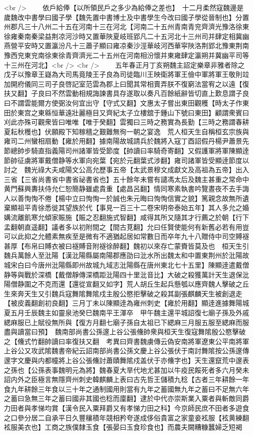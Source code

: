 <br />
　　依戶給俸【以所領民戶之多少為給俸之差也】　十二月柔然寇魏邊是歲魏改中書學曰國子學【魏先置中書博士及中書學生今改曰國子學從晉制也】分置州郡凡三十八州二十五在河南十三在河北【河南二十五州青南青兖齊濟光豫洛徐東徐雍秦南秦梁益荆凉河沙時又置華陜夏岐班郢凡二十五河北十三州司并肆定相冀幽燕營平安時又置瀛汾凡十三蕭子顯曰雍凉秦沙涇華岐河西華寜陜洛荆郢北豫東荆南豫西兖東兖南徐東徐青齊濟光二十五州在河南相汾懷并東雍肆定瀛朔并冀幽平司等十三州在河北】<br />
<br />
　　五年春正月丁亥朔魏主詔定樂章非雅者除之　戊子以豫章王嶷為大司馬竟陵王子良為司徒臨川王映衛將軍王儉中軍將軍王敬則竝加開府儀同三司子良啓記室范雲為郡上曰聞其常相賣弄朕不復窮法當宥之以遠【復扶又翻】子良曰不然雲動相規誨諫書具存遂取以奏凡百餘紙辭皆切直上歎息謂子良曰不謂雲能爾方使弼汝何宜出守【守式又翻】文惠太子嘗出東田觀穫【時太子作東田於東宫之東緜恒華遠壯麗極目又齊紀太子立樓舘于鍾山下號曰東田】顧謂衆賓曰刈此亦殊可觀衆皆曰唯唯【唯于癸翻】雲獨曰三時之務實為長勤【三時之務謂春耕夏耘秋穫也】伏願殿下知稼穡之艱難無徇一朝之宴逸　荒人桓天生自稱桓玄宗族與雍司二州蠻相扇動【雍於用翻】據南陽故城請兵於魏將入寇丁酉詔假丹楊尹蕭景先節總帥步騎直指義陽司州諸軍皆受節度【帥讀曰率騎奇寄翻】又假護軍將軍陳顯逹節帥征虜將軍戴僧静等水軍向宛葉【宛於元翻葉式涉翻】雍司諸軍皆受顯逹節度以討之　魏光祿大夫咸陽文公高允歷事五帝【太武景穆文成獻文及高祖為五帝】出入三省【三省尚書省中書省祕書省也】五十餘年未嘗有譴馮太后及魏主甚重之常命中黄門蘇興夀扶侍允仁恕簡静雖處貴重【處昌呂翻】情同寒素執書吟覽晝夜不去手誨人以善恂恂不倦【楊中立曰恂恂一於誠也朱元晦曰恂恂信實之貌】篤親念故無所遺棄顯祖平青徐悉徙其望族於代【事見一百三十二卷宋明帝泰始五年】其人多允之婚媾流離飢寒允傾家賑施【賑之忍翻施式智翻】咸得其所又隨其才行薦之於朝【行下孟翻朝直遥翻】議者多以初附間之【間古莧翻】允曰任賢使能何有新舊必若有用豈可以此抑之允體素無疾至是微有不適猶起居如常數日而卒年九十八贈侍中司空賻襚甚厚【布帛曰賻衣被曰襚賻音附襚徐醉翻】魏初以來存亡蒙賚皆莫及也　桓天生引魏兵萬餘人至沘陽【漢沘陽縣屬南陽郡應劭曰沘水所出魏太和中置東荆州於沘陽故城宋白曰今唐州沘陽縣即州故城九域志沘陽縣在唐州東北七十五里】陳顯逹遣戴僧静等與戰於深橋【戴僧靜傳深橋距沘陽四十里沘音比】大破之殺獲萬計天生退保沘陽僧静圍之不克而還【還從宣翻又如字】荒人胡丘生起兵懸瓠以應齊魏人擊破之丘生來奔天生又引魏兵寇舞隂舞隂戍主殷公愍拒擊破之殺其副張麒麟天生被創退走【被皮義翻創初良翻】三月丁未以陳顯逹為雍州刺史【雍於用翻】顯逹進據舞陽城　夏五月壬辰魏主如靈泉池癸巳魏南平王渾卒　甲午魏主還平城詔復七廟子孫及外戚緦麻服已上賦役無所與【復方月翻七廟子孫自太祖已下緦麻三月服五服至緦麻而服盡與讀當曰預】　魏南部尚書公孫邃上谷公張儵帥衆與桓天生復寇舞隂殷公愍擊破之【儵式竹翻帥讀曰率復扶又翻　考異曰齊書魏虜傳云偽安南將軍遼東公平南將軍上谷公又攻武隂魏書帝紀云詔南部尚書公孫文慶上谷公張伏于南討舞隂按公孫邃傳邃字文慶與内都幢將上谷公張儵討蕭賾舞隂戍盖伏于亦儵字也】天生還竄荒中邃表之孫也【公孫表事魏明元為將】魏春夏大旱代地尤甚加以牛疫民餒死者多六月癸未詔内外之臣極言無隱齊州刺史韓麒麟上表曰古先哲王儲積九稔【古者三年耕餘一年食九年耕餘三年食以三十年之通制國用則當有九年之蓄國無九年之蓄曰不足無六年之蓄曰急無三年之蓄曰國非其國也稔而廩翻】逮於中代亦崇斯業入粟者與斬敵同爵力田者與孝悌均賞【漢令民入粟拜爵又有孝悌力田之科】今京師民庶不田者多遊食之口參分居二自承平日久豐穰積年競相矜夸遂成侈俗貴富之家童妾袨服【袨黄練翻袨服美衣也】工商之族僕隸玉食【張晏曰玉食珍食也】而農夫闕糟糠蠶婦乏短褐